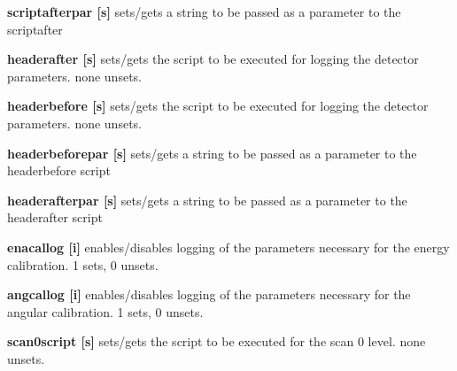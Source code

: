 \begin{DoxyItemize}
\item {\bfseries scriptafterpar \mbox{[}s\mbox{]}} sets/gets a string to be passed as a parameter to the scriptafter
\end{DoxyItemize}


\begin{DoxyItemize}
\item {\bfseries headerafter \mbox{[}s\mbox{]}} sets/gets the script to be executed for logging the detector parameters. {\ttfamily none} unsets.
\end{DoxyItemize}


\begin{DoxyItemize}
\item {\bfseries headerbefore \mbox{[}s\mbox{]}} sets/gets the script to be executed for logging the detector parameters. {\ttfamily none} unsets.
\end{DoxyItemize}


\begin{DoxyItemize}
\item {\bfseries headerbeforepar \mbox{[}s\mbox{]}} sets/gets a string to be passed as a parameter to the headerbefore script
\end{DoxyItemize}


\begin{DoxyItemize}
\item {\bfseries headerafterpar \mbox{[}s\mbox{]}} sets/gets a string to be passed as a parameter to the headerafter script
\end{DoxyItemize}


\begin{DoxyItemize}
\item {\bfseries enacallog \mbox{[}i\mbox{]}} enables/disables logging of the parameters necessary for the energy calibration. 1 sets, 0 unsets.
\end{DoxyItemize}


\begin{DoxyItemize}
\item {\bfseries angcallog \mbox{[}i\mbox{]}} enables/disables logging of the parameters necessary for the angular calibration. 1 sets, 0 unsets.
\end{DoxyItemize}


\begin{DoxyItemize}
\item {\bfseries scan0script \mbox{[}s\mbox{]}} sets/gets the script to be executed for the scan 0 level. {\ttfamily none} unsets.
\end{DoxyItemize}


